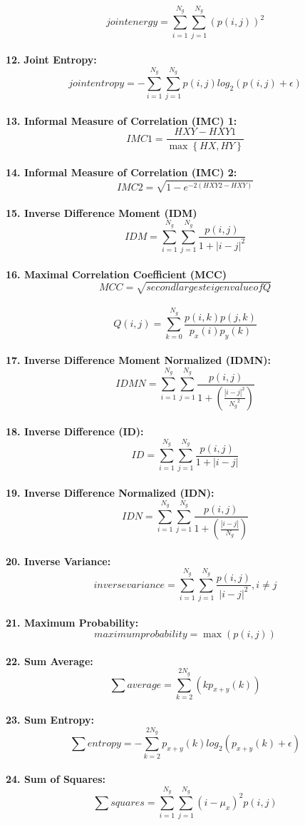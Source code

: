 \[\textit{jointenergy}=\sum _{i=1}^{N_{g}}\sum _{j=1}^{N_{g}}\left(p\left(i,j\right)\right)^{2}\]\\
\textbf{12.} \textbf{Joint Entropy:}\\
\[\textit{jointentropy}=-\sum _{i=1}^{N_{g}}\sum _{j=1}^{N_{g}}p\left(i,j\right)log_{2}\left(p\left(i,j\right)+\epsilon \right)\]\\
\textbf{13. Informal Measure of Correlation (IMC) 1:}\\
\[IMC1=\frac{HXY-HXY1}{\max \left\{HX,HY\right\}}\]\\
\textbf{14. Informal Measure of Correlation (IMC) 2:}\\
\[IMC2=\sqrt{1-e^{-2\left(HXY2-HXY\right)}}\]\\
\textbf{15. Inverse Difference Moment (IDM)}\\
\[IDM=\sum _{i=1}^{N_{g}}\sum _{j=1}^{N_{g}}\frac{p\left(i,j\right)}{1+\left| i-j\right| ^{2}}\]\\
\textbf{16. Maximal Correlation Coefficient (MCC)}\\
\[MCC=\sqrt{\textit{secondlargesteigenvalueofQ}}\]\\
\[Q\left(i,j\right)=\sum _{k=0}^{N_{g}}\frac{p\left(i,k\right)p\left(j,k\right)}{p_{x}\left(i\right)p_{y}\left(k\right)}\]\\
\textbf{17. Inverse Difference Moment Normalized (IDMN):}\\
\[IDMN=\sum _{i=1}^{N_{g}}\sum _{j=1}^{N_{g}}\frac{p\left(i,j\right)}{1+\left(\frac{\left| i-j\right| ^{2}}{{N_{g}}^{2}}\right)}\]\\
\textbf{18. Inverse Difference (ID):}\\
\[ID=\sum _{i=1}^{N_{g}}\sum _{j=1}^{N_{g}}\frac{p\left(i,j\right)}{1+\left| i-j\right| }\]\\
\textbf{19. Inverse Difference Normalized (IDN):}\\
\[IDN=\sum _{i=1}^{N_{g}}\sum _{j=1}^{N_{g}}\frac{p\left(i,j\right)}{1+\left(\frac{\left| i-j\right| }{N_{g}}\right)}\]\\
\textbf{20. Inverse Variance:}\\
\[\textit{inversevariance}=\sum _{i=1}^{N_{g}}\sum _{j=1}^{N_{g}}\frac{p\left(i,j\right)}{\left| i-j\right| ^{2}} ,i\neq j\]\\
\textbf{21. Maximum Probability:}\\
\[\textit{maximumprobability}=\max \left(p\left(i,j\right)\right)\]\\
\textbf{22. Sum Average:}\\
\[\sum \textit{average}=\sum _{k=2}^{2N_{g}}\left(kp_{x+y}\left(k\right)\right)\]\\
\textbf{23. Sum Entropy:}\\
\[\sum \textit{entropy}=-\sum _{k=2}^{2N_{g}}p_{x+y}\left(k\right)log_{2}\left(p_{x+y}\left(k\right)+\epsilon \right)\]\\
\textbf{24. Sum of Squares:}\\
\[\sum \textit{squares}=\sum _{i=1}^{N_{g}}\sum _{j=1}^{N_{g}}\left(i-\mu _{x}\right)^{2}p\left(i,j\right)\]


